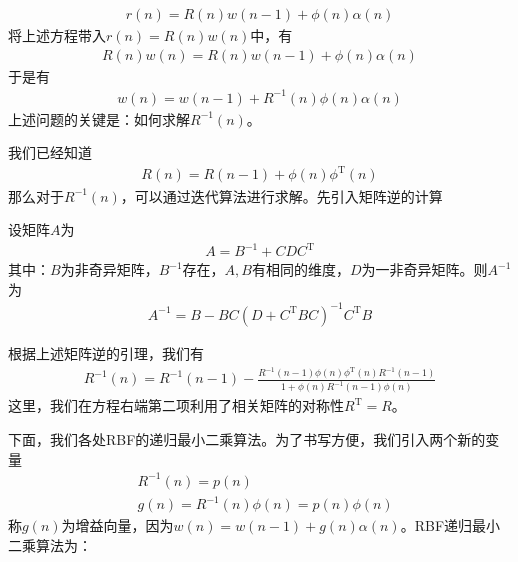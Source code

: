             \begin{align*}
            r(n) = R(n)w(n-1) + \phi(n)\alpha(n)
            \end{align*}
            将上述方程带入$r(n) = R(n)w(n)$中，有
            \begin{align*}
            R(n)w(n) = R(n)w(n-1)+\phi(n)\alpha(n)
            \end{align*}
            于是有
            \begin{align*}
            w(n) = w(n-1) + R^{-1}(n) \phi(n)\alpha(n)
            \end{align*}
            上述问题的关键是：如何求解$R^{-1}(n)$。
            \par
            我们已经知道
            \begin{align*}
            R(n) = R(n-1)+\phi(n)\phi^\mathrm{T}(n)
            \end{align*}
            那么对于$R^{-1}(n)$，可以通过迭代算法进行求解。先引入矩阵逆的计算
            \begin{lemma}[矩阵逆的计算]
            设矩阵$A$为
            \begin{align*}
            A = B^{-1}+ CDC^{\mathrm{T}}
            \end{align*}
            其中：$B$为非奇异矩阵，$B^{-1}$存在，$A,B$有相同的维度，$D$为一非奇异矩阵。则$A^{-1}$为
            \begin{align*}
            A^{-1} = B-BC(D+C^\mathrm{T}BC)^{-1}C^\mathrm{T}B
            \end{align*}
            \end{lemma}
            \par
            根据上述矩阵逆的引理，我们有
            \begin{align*}
            R^{-1}(n) = R^{-1}(n-1) - \frac{R^{-1}(n-1)\phi(n)\phi^\mathrm{T}(n)R^{-1}(n-1)}{1+\phi(n)R^{-1}(n-1)\phi(n)}
            \end{align*}
            这里，我们在方程右端第二项利用了相关矩阵的对称性$R^\mathrm{T} = R$。
            \par
            下面，我们各处RBF的递归最小二乘算法。为了书写方便，我们引入两个新的变量
            \begin{align*}
            & R^{-1}(n) = p(n)\\
            & g(n) = R^{-1}(n)\phi(n)= p(n)\phi(n)
            \end{align*}
            称$g(n)$为增益向量，因为$w(n) = w(n-1)+g(n)\alpha(n)$。RBF递归最小二乘算法为：\\
